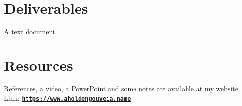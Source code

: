 \documentclass[12pt]{article}
\begin{document}
\section*{Deliverables}
A text document


\section*{Resources}
References, a video, a PowerPoint and some notes are available at my website
Link: \href{https://www.aholdengouveia.name}{\textbf{\nolinkurl{https://www.aholdengouveia.name}}}
\end{document}
